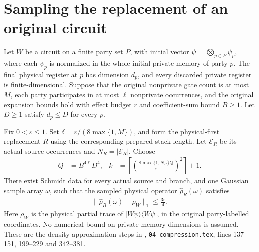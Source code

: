 \section{Sampling the replacement of an original circuit}
\label{sec:peps_sampled_original_circuit}

\begin{theorem}
    \label{thm:peps_sampled_original_density}
    \leanok
    Let $W$ be a circuit on a finite party set $P$, with initial vector
    $\psi=\bigotimes_{p\in P}\psi_p$, where each $\psi_p$ is normalized
    in the whole initial private memory of party $p$. The final physical
    register at $p$ has dimension $d_p$, and every discarded private
    register is finite-dimensional. Suppose that the original nonprivate
    gate count is at most $M$, each party participates in at most $\ell$
    nonprivate occurrences, and the original expansion bounds hold with
    effect budget $r$ and coefficient-sum bound $B\ge1$. Let $D\ge1$
    satisfy $d_p\le D$ for every $p$.

    Fix $0<\varepsilon\le1$. Set
    $\delta=\varepsilon/(8\max\{1,M\})$, and form the physical-first
    replacement $R$ using the corresponding prepared stack length.
    Let $\mathcal E_R$ be its actual source occurrences and
    $N_R=|\mathcal E_R|$. Choose
    \begin{align}
        Q&=B^{4\ell}D^4, &
        k&=\left\lceil
            \left(\frac{8\max\{1,N_R\}Q}{\varepsilon}\right)^2
          \right\rceil+1.
        \label{eq:peps_original_sample_count}
    \end{align}
    There exist Schmidt data for every actual source and branch, and
    one Gaussian sample array $\omega$, such that the sampled physical
    operator $\widehat\rho_R(\omega)$ satisfies
    \begin{align}
        \|\widehat\rho_R(\omega)-\rho_W\|_1
        \le\frac{3\varepsilon}{4}.
        \label{eq:peps_original_sample_error}
    \end{align}
    Here $\rho_W$ is the physical partial trace of $|W\psi\rangle
    \langle W\psi|$, in the original party-labelled coordinates.
    No numerical bound on private-memory dimensions is assumed.
    These are the density-approximation steps in
    \cite[proof of Theorem~5.2]{OpenAI2026PolynomialPEPS},
    \texttt{04-compression.tex}, lines 137--151, 199--229 and 342--381.
\end{theorem}

